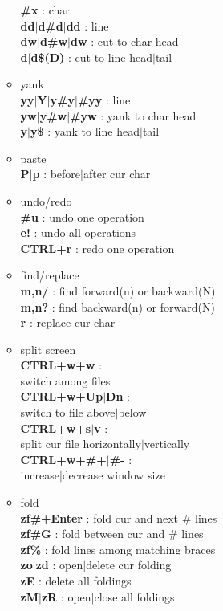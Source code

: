 \documentclass[10pt, a4paper]{article}
\begin{document}
\begin{enumerate}
\begin{itemize}
	\textbf{\#x} : char \\
	\textbf{dd{$|$}d\#d{$|$}dd} : line \\
	\textbf{dw{$|$}d\#w{$|$}dw} : cut to char head \\
	\textbf{d\^{$|$}d\$(D)} : cut to line head{$|$}tail
	\item yank \\
	\textbf{yy{$|$}Y{$|$}y\#y{$|$}\#yy} : line \\
	\textbf{yw{$|$}y\#w{$|$}\#yw} : yank to char head \\
	\textbf{y\^{$|$}y\$} : yank to line head{$|$}tail
	\item paste \\
	\textbf{P{$|$}p} : before{$|$}after cur char
	\item undo/redo \\
	\textbf{\#u} : undo one operation\\ 
	\textbf{e!} : undo all operations \\
	\textbf{CTRL+r} : redo one operation
	\item find/replace \\
	\textbf{m,n/} : find forward(n) or backward(N) \\ 
	\textbf{m,n?} : find backward(n) or forward(N) \\
	\textbf{r} : replace cur char
	\item split screen \\
	\textbf{CTRL+w+w} : \\ switch among files \\
	\textbf{CTRL+w+Up{$|$}Dn} : \\ switch to file above{$|$}below \\
	\textbf{CTRL+w+s{$|$}v} : \\ split cur file horizontally{$|$}vertically \\
	\textbf{CTRL+w+\#+{$|$}\#-} : \\ increase{$|$}decrease window size 
	\item fold \\
	\textbf{zf\#+Enter} : fold cur and next \# lines \\
	\textbf{zf\#G} : fold between cur and \# lines \\
	\textbf{zf\%} : fold lines among matching braces \\
	\textbf{zo{$|$}zd} : open{$|$}delete cur folding \\
	\textbf{zE} : delete all foldings \\
	\textbf{zM{$|$}zR} : open{$|$}close all foldings

\end{itemize}
\end{enumerate}
\end{document}
